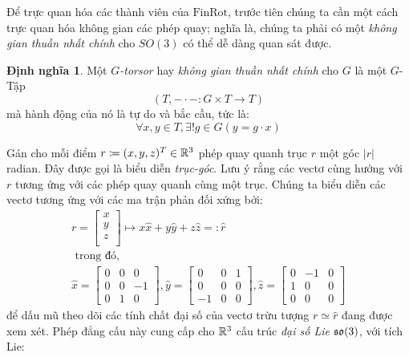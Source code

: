 \documentclass{article}
\theoremstyle{plain}
\theoremstyle{definition}
\newtheorem*{definition}{Định nghĩa}
\begin{document}
    Để trực quan hóa các thành viên của $\mathrm{FinRot}$, trước tiên chúng ta cần một cách trực quan hóa không gian các phép quay; nghĩa là, chúng ta phải có một \emph{không gian thuần nhất chính} cho $SO(3)$ có thể dễ dàng quan sát được. 
    \begin{definition}
       Một \emph{$G$-torsor} hay \emph{không gian thuần nhất chính} cho $G$ là một $G$-Tập \[(T,-\cdot-: G\times T\to T)\] mà hành động của nó là tự do và bắc cầu, tức là: 
       \begin{equation}
           \forall x,y\in T,\exists!  g\in G(y=g\cdot x)
       \end{equation}
    \end{definition}
    Gán cho mỗi điểm $r\coloneqq(x,y,z)^T\in \mathbb{R}^3$ phép quay quanh trục $r$ một góc $|r|$ radian.  Đây được gọi là biểu diễn \emph{trục-góc}. Lưu ý rằng các vectơ cùng hướng với $r$ tương ứng với các phép quay quanh cùng một trục.  Chúng ta biểu diễn các vectơ tương ứng với các ma trận phản đối xứng bởi: 
    \begin{gather}
        r=\begin{bmatrix}
        x \\
        y \\
        z \\
        \end{bmatrix}\mapsto x\hat{x}+y\hat{y}+z\hat{z}=:\hat{r}\\
        \text{ trong đó, }\nonumber\\
        \hat{x} = \begin{bmatrix}
        0 & 0 & 0 \\
        0 & 0 & -1 \\
        0 & 1 & 0
        \end{bmatrix},
        \hat{y} = \begin{bmatrix}
        0 & 0 & 1 \\
        0 & 0 & 0 \\
        -1 & 0 & 0
        \end{bmatrix},
        \hat{z} = \begin{bmatrix}
        0 & -1 & 0 \\
        1 & 0 & 0 \\
        0 & 0 & 0
        \end{bmatrix}
    \end{gather}
    để dấu mũ theo dõi các tính chất đại số của vectơ trừu tượng $r\simeq \hat{r}$ đang được xem xét.  Phép đẳng cấu này cung cấp cho $\mathbb{R}^3$ cấu trúc \emph{đại số Lie} $\mathfrak{so}(3)$, với tích Lie: 
\end{document}
